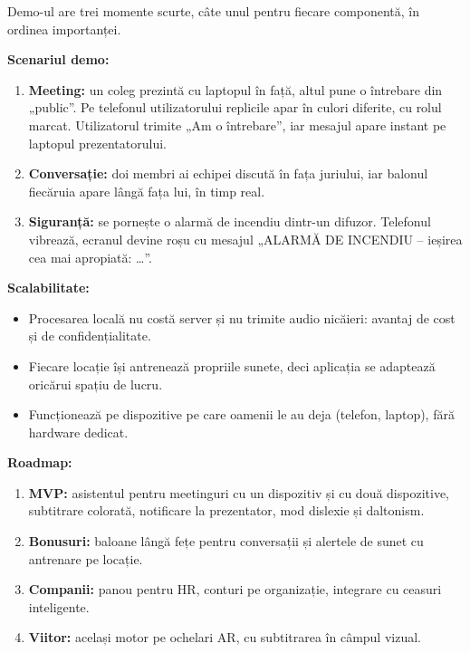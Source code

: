 \documentclass[11pt,a4paper]{article}
\begin{document}
Demo-ul are trei momente scurte, câte unul pentru fiecare componentă, în ordinea importanței.

\textbf{Scenariul demo:}
\begin{enumerate}
  \item \textbf{Meeting:} un coleg prezintă cu laptopul în față, altul pune o întrebare din „public”. Pe telefonul utilizatorului replicile apar în culori diferite, cu rolul marcat. Utilizatorul trimite „Am o întrebare”, iar mesajul apare instant pe laptopul prezentatorului.
  \item \textbf{Conversație:} doi membri ai echipei discută în fața juriului, iar balonul fiecăruia apare lângă fața lui, în timp real.
  \item \textbf{Siguranță:} se pornește o alarmă de incendiu dintr-un difuzor. Telefonul vibrează, ecranul devine roșu cu mesajul „ALARMĂ DE INCENDIU -- ieșirea cea mai apropiată: \ldots”.
\end{enumerate}

\textbf{Scalabilitate:}
\begin{itemize}
  \item Procesarea locală nu costă server și nu trimite audio nicăieri: avantaj de cost și de confidențialitate.
  \item Fiecare locație își antrenează propriile sunete, deci aplicația se adaptează oricărui spațiu de lucru.
  \item Funcționează pe dispozitive pe care oamenii le au deja (telefon, laptop), fără hardware dedicat.
\end{itemize}

\textbf{Roadmap:}
\begin{enumerate}
  \item \textbf{MVP:} asistentul pentru meetinguri cu un dispozitiv și cu două dispozitive, subtitrare colorată, notificare la prezentator, mod dislexie și daltonism.
  \item \textbf{Bonusuri:} baloane lângă fețe pentru conversații și alertele de sunet cu antrenare pe locație.
  \item \textbf{Companii:} panou pentru HR, conturi pe organizație, integrare cu ceasuri inteligente.
  \item \textbf{Viitor:} același motor pe ochelari AR, cu subtitrarea în câmpul vizual.
\end{enumerate}
\end{document}
